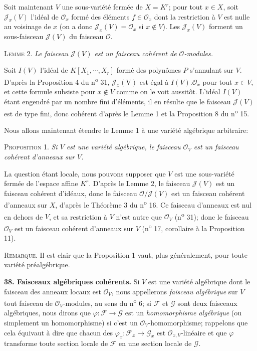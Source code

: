 Soit maintenant $V$ une sous-variété fermée de $X = K^r$; pour tout $x \in X$, soit $\mathcal{J}_x(V)$ l'idéal de $\mathcal{O}_x$ formé des éléments $f \in \mathcal{O}_x$ dont la restriction à $V$ est nulle au voisinage de $x$ (on a donc $\mathcal{J}_x(V) = \mathcal{O}_x$ si $x \notin V$). Les $\mathcal{J}_x(V)$ forment un sous-faisceau $\mathcal{J}(V)$ du faisceau $\mathcal{O}$.

\textsc{Lemme} 2. \textit{Le faisceau $\mathcal{J}(V)$ est un faisceau cohérent de $\mathcal{O}$-modules.}

Soit $I(V)$ l'idéal de $K[X_1, \cdots , X_r]$ formé des polynômes $P$ s'annulant sur $V$. D'après la Proposition 4 du n\textsuperscript{o} 31, $\mathcal{J}_x(\mathrm{V})$ est égal à $I(V).\mathcal{O}_x$ pour tout $x \in V$, et
cette formule subsiste pour $x \notin V$ comme on le voit aussitôt. L'idéal $I(V)$ étant engendré par un nombre fini d'éléments, il en résulte que le faisceau $\mathcal{J}(V)$ est de type fini, donc cohérent d'après le Lemme 1 et la Proposition 8 du n\textsuperscript{o} 15.

Nous allons maintenant étendre le Lemme 1 à une variété algébrique arbitraire:

\textsc{Proposition} 1. \textit{Si $V$ est une variété algébrique, le faisceau $\mathcal{O}_V$ est un faisceau cohérent d'anneaux sur $V$.}

La question étant locale, nous pouvons supposer que $V$ est une sous-variété fermée de l'espace affine $K^r$. D'après le Lemme 2, le faisceau $\mathcal{J}(V)$ est un faisceau cohérent d'idéaux, donc le faisceau $\mathcal{O}/\mathcal{J}(V)$ est un faisceau cohérent d'anneaux sur $X$, d'après le Théorème 3 du n\textsuperscript{o} 16. Ce faisceau d'anneaux est nul en dehors de $V$, et sa restriction à $V$ n'est autre que $\mathcal{O}_V$ (n\textsuperscript{o} 31); donc le faisceau $\mathcal{O}_V$ est un faisceau cohérent d'anneaux sur $V$ (n\textsuperscript{o} 17, corollaire à la Proposition 11).

\textsc{Remarque}. Il est clair que la Proposition 1 vaut, plus généralement, pour toute variété préalgébrique.

\textbf{38. Faisceaux algébriques cohérents.} Si $V$ est une variété algébrique dont le faisceau des anneaux locaux est $\mathcal{O}_V$, nous appellerons \textit{faisceau algébrique} sur $V$ tout faisceau de $\mathcal{O}_V$-modules, au sens du n\textsuperscript{o} 6; si $\mathcal{F}$ et $\mathcal{G}$ sont deux faisceaux algébriques, nous dirons que $\varphi : \mathcal{F} \to \mathcal{G}$ est un \textit{homomorphisme algébrique} (ou simplement un homomorphisme) si c'est un $\mathcal{O}_V$-homomorphisme; rappelons que cela équivaut à dire que chacun des $\varphi_x : \mathcal{F}_x \to \mathcal{G}_x$ est $\mathcal{O}_{x,V}$-linéaire et que $\varphi$ transforme toute section locale de $\mathcal{F}$ en une section locale de $\mathcal{G}$.

